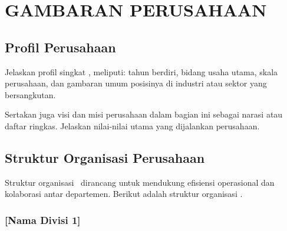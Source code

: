 \chapter{GAMBARAN PERUSAHAAN}

\section{Profil Perusahaan}

Jelaskan profil singkat \NamaPerusahaan, meliputi: tahun berdiri, bidang usaha
utama, skala perusahaan, dan gambaran umum posisinya di industri atau sektor
yang bersangkutan.

Sertakan juga visi dan misi perusahaan dalam bagian ini sebagai narasi
atau daftar ringkas. Jelaskan nilai-nilai utama yang dijalankan perusahaan.


\section{Struktur Organisasi Perusahaan}

Struktur organisasi \NamaPerusahaan\ dirancang untuk mendukung efisiensi
operasional dan kolaborasi antar departemen. Berikut adalah struktur organisasi
\NamaPerusahaan.


\subsection{[Nama Divisi 1]}

